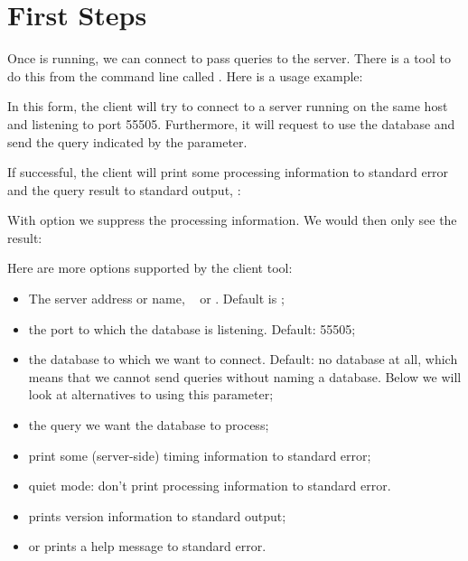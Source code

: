\section{First Steps}
Once  is running, we can connect to pass
queries to the server. There is a tool to do this from the command line
called . Here is a usage example:


In this form, the client will try to connect to a server
running on the same host and listening to port 55505.
Furthermore, it will request to use the database 
and send the query indicated by the  parameter.

\begin{minipage}{\textwidth}
If successful, the client will print some
processing information to standard error and the query result
to standard output, \eg:

\end{minipage}

\begin{minipage}{\textwidth}
With option  we suppress the processing information.
We would then only see the result:

\end{minipage}

\begin{minipage}{\textwidth}
Here are more options supported by the client tool:
\begin{itemize}
\item {} 
The server address or name, \eg\  or
. Default is ;

\item {}
the port to which the database is listening. Default: 55505;

\item {}
the database to which we want to connect. 
Default: no database at all, which means
that we cannot send queries without naming a database.
Below we will look at alternatives to using this parameter;

\item {}
the query we want the database to process;

\item {}
print some (server-side) timing information to standard error;

\item {}
quiet mode: don't print processing information to standard error.

\item {} prints version information to standard output;
\item {} or  prints a help message to standard error.
\end{itemize}
\end{minipage}

